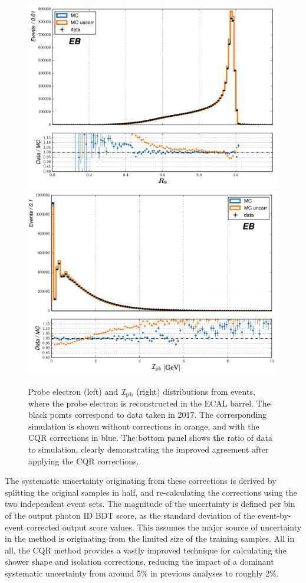 \begin{figure}[htb!]
  \centering
  \includegraphics[width=.49\textwidth]{Figures/hgg_overview/dataMC_probeR9_0_corr.pdf}
  \includegraphics[width=.49\textwidth]{Figures/hgg_overview/dataMC_probePhoIso_0_corr.pdf}
  \caption[Corrections from the chained quantile regression method for \RNINE and $\mathcal{I}_{\rm{ph}}$]
  {
    Probe electron \RNINE (left) and $\mathcal{I}_{\rm{ph}}$ (right) distributions from \Zee events, where the probe electron is reconstructed in the ECAL barrel. The black points correspond to data taken in 2017. The corresponding simulation is shown without corrections in orange, and with the CQR corrections in blue. The bottom panel shows the ratio of data to simulation, clearly demonstrating the improved agreement after applying the CQR corrections.
  }
  \label{fig:photon_id_0}
\end{figure}

The systematic uncertainty originating from these corrections is derived by splitting the original \Zee samples in half, and re-calculating the corrections using the two independent event sets. The magnitude of the uncertainty is defined per bin of the output photon ID BDT score, as the standard deviation of the event-by-event corrected output score values. This assumes the major source of uncertainty in the method is originating from the limited size of the training samples. All in all, the CQR method provides a vastly improved technique for calculating the shower shape and isolation corrections, reducing the impact of a dominant systematic uncertainty from around 5\% in previous \Hgg analyses to roughly 2\%.

